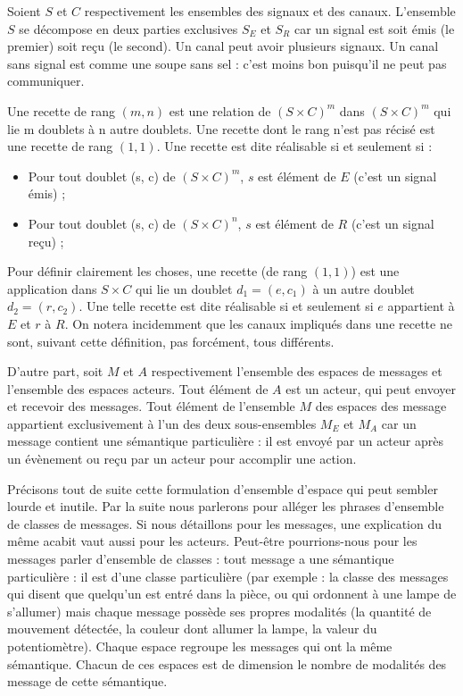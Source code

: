 \documentclass[11pt]{article}
\begin{document}
Soient $S$ et $C$ respectivement les ensembles des signaux et des canaux. L'ensemble $S$ se décompose en deux parties exclusives $S_E$ et $S_R$ car un signal est soit émis (le premier) soit reçu (le second). Un canal peut avoir plusieurs signaux. Un canal sans signal est comme une soupe sans sel : c'est moins bon puisqu'il ne peut pas communiquer.

Une recette de rang $(m, n)$ est une relation de $\left(S×C\right)^m$ dans $\left(S×C\right)^m$ qui lie m doublets à n autre doublets. Une recette dont le rang n'est pas récisé est une recette de rang $(1, 1)$. Une recette est dite réalisable si et seulement si :
\begin{itemize}
\item Pour tout doublet (s, c) de $\left(S×C\right)^m$, $s$ est élément de $E$ (c'est un signal émis) ;
\item Pour tout doublet (s, c) de $\left(S×C\right)^n$, $s$ est élément de $R$ (c'est un signal reçu) ;
\end{itemize}
Pour définir clairement les choses, une recette (de rang $(1, 1)$) est une application dans $S×C$ qui lie un doublet $d_1 = (e, c_1)$ à un autre doublet $d_2 = (r, c_2)$. Une telle recette est dite réalisable si et seulement si $e$ appartient à $E$ et $r$ à $R$. On notera incidemment que les canaux impliqués dans une recette ne sont, suivant cette définition, pas forcément, tous différents.

D'autre part, soit $M$ et $A$ respectivement l'ensemble des espaces de messages et l'ensemble des espaces acteurs. Tout élément de $A$ est un acteur, qui peut envoyer et recevoir des messages. Tout élément de l'ensemble $M$ des espaces des message appartient exclusivement à l'un des deux sous-ensembles $M_E$ et $M_A$ car un message contient une sémantique particulière : il est envoyé par un acteur après un évènement ou reçu par un acteur pour accomplir une action.

Précisons tout de suite cette formulation d'\og ensemble d'espace \fg{} qui peut sembler lourde et inutile. Par la suite nous parlerons pour alléger les phrases d'ensemble de classes de messages. Si nous détaillons pour les messages, une explication du même acabit vaut aussi pour les acteurs. Peut-être pourrions-nous pour les messages parler d'ensemble de classes : tout message a une sémantique particulière : il est d'une classe particulière (par exemple : la classe des messages qui disent que quelqu'un est entré dans la pièce, ou qui ordonnent à une lampe de s'allumer) mais chaque message possède ses propres modalités (la quantité de mouvement détectée, la couleur dont allumer la lampe, la valeur du potentiomètre). Chaque espace regroupe les messages qui ont la même sémantique. Chacun de ces espaces est de dimension le nombre de modalités des message de cette sémantique.
\end{document}
